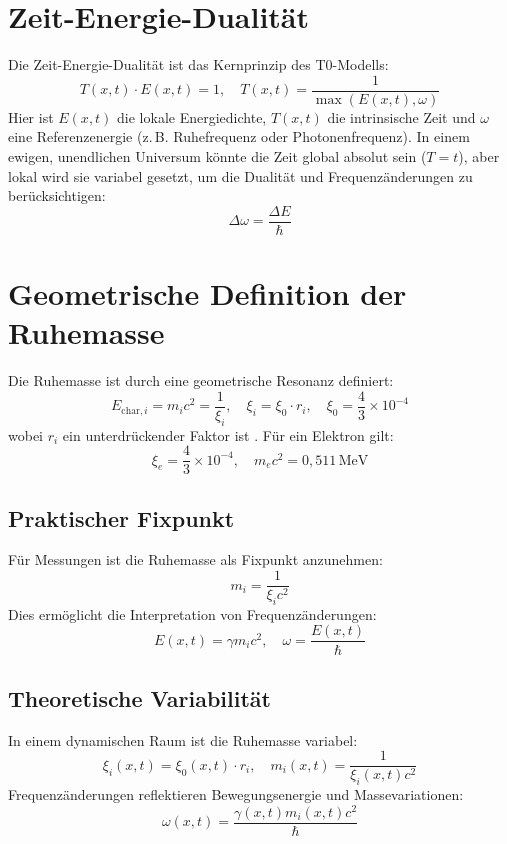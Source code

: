 \documentclass[12pt,a4paper]{article}
\begin{document}
	\section{Zeit-Energie-Dualität}
	Die Zeit-Energie-Dualität ist das Kernprinzip des T0-Modells:
	\begin{equation}
		T(x,t) \cdot E(x,t) = 1, \quad T(x,t) = \frac{1}{\max(E(x,t), \omega)}
	\end{equation}
	Hier ist \(E(x,t)\) die lokale Energiedichte, \(T(x,t)\) die intrinsische Zeit und \(\omega\) eine Referenzenergie (z.\,B. Ruhefrequenz oder Photonenfrequenz). In einem ewigen, unendlichen Universum könnte die Zeit global absolut sein (\( T = t \)), aber lokal wird sie variabel gesetzt, um die Dualität und Frequenzänderungen zu berücksichtigen:
	\begin{equation}
		\Delta \omega = \frac{\Delta E}{\hbar}
	\end{equation}
	
	\section{Geometrische Definition der Ruhemasse}
	Die Ruhemasse ist durch eine geometrische Resonanz definiert:
	\begin{equation}
		E_{\text{char},i} = m_i c^2 = \frac{1}{\xi_i}, \quad \xi_i = \xi_0 \cdot r_i, \quad \xi_0 = \frac{4}{3} \times 10^{-4}
	\end{equation}
	wobei \(r_i\) ein unterdrückender Faktor ist \cite{pascher_t0_energie_2025}. Für ein Elektron gilt:
	\begin{equation}
		\xi_e = \frac{4}{3} \times 10^{-4}, \quad m_e c^2 = 0{,}511 \, \text{MeV}
	\end{equation}
	
	\subsection{Praktischer Fixpunkt}
	Für Messungen ist die Ruhemasse als Fixpunkt anzunehmen:
	\begin{equation}
		m_i = \frac{1}{\xi_i c^2}
	\end{equation}
	Dies ermöglicht die Interpretation von Frequenzänderungen:
	\begin{equation}
		E(x,t) = \gamma m_i c^2, \quad \omega = \frac{E(x,t)}{\hbar}
	\end{equation}
	
	\subsection{Theoretische Variabilität}
	In einem dynamischen Raum ist die Ruhemasse variabel:
	\begin{equation}
		\xi_i(x,t) = \xi_0(x,t) \cdot r_i, \quad m_i(x,t) = \frac{1}{\xi_i(x,t) c^2}
	\end{equation}
	Frequenzänderungen reflektieren Bewegungsenergie und Massevariationen:
	\begin{equation}
		\omega(x,t) = \frac{\gamma(x,t) m_i(x,t) c^2}{\hbar}
	\end{equation}
	
\end{document}
